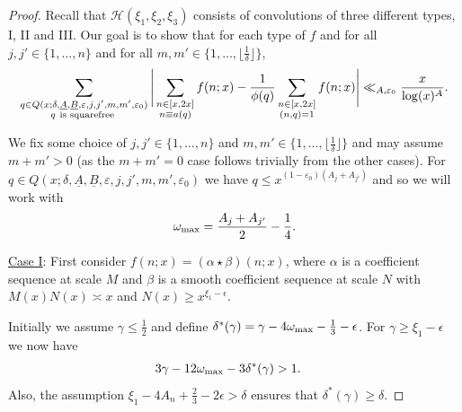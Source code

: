 \documentclass{amsart}
\numberwithin{equation}{section}
\begin{document}
\begin{proof}
Recall that $\mathcal{H}(\xi_1,\xi_2,\xi_3)$ consists of convolutions of three different types, I, II and III.   Our goal is to show that for each type of $f$ and for   all $j, j'\in \{1, \dots, n\}$ and for all $m, m' \in \{1, \dots, \lfloor \frac{1}{\delta} \rfloor\}$,
\begin{align*} 
\sum_{\substack{q \in Q(x;\delta,\underline{A},\underline{B},\varepsilon,j,j',m,m',\varepsilon_0) \\  q \mbox{ \scriptsize  is squarefree  }   }}  \Bigg| \sum_{\substack{n \in [x,2x] \\ n \equiv a (q)}} f(n;x) - \dfrac{1}{\phi(q)} \sum_{\substack{ n \in [x,2x] \\ (n,q)=1}}f(n;x) \Bigg| \ll_{A,\varepsilon_0} \dfrac{x}{\log(x)^A}.
\end{align*}

We fix some choice of $j, j'\in \{1, \dots, n\}$ and   $m, m' \in \{1, \dots, \lfloor \frac{1}{\delta} \rfloor\}$ and may assume $m+m' >0$ (as the $m+m'=0$ case follows trivially from the other cases). For $q  \in Q(x;\delta,\underline{A},\underline{B},\varepsilon,j,j',m,m',\varepsilon_0)$ we have 
$ q \leq  x^{(1-\varepsilon_0)(A_j + A_{j'})} $ and so we will work with 
$$ \omega_{\begin{scriptsize}
\mbox{max}
\end{scriptsize}} =   \frac{A_j + A_{j'}}{2}  - \frac{1}{4}.$$

\smallskip
\underline{Case I}: First consider  $f(n;x) = (\alpha \star \beta)(n;x)$, where $\alpha$ is a coefficient sequence at scale $M$ and $\beta$ is a  smooth  coefficient sequence at scale $N$ with $M(x) N(x) \asymp x$  and  $
N(x) \geq x^{ \xi_1-\epsilon} 
$. 



\medskip   Initially we assume $\gamma \leq \frac{1}{2}$ and define $
\delta^*(\gamma) =     \gamma - 4\omega_{\begin{scriptsize}
\mbox{max}
\end{scriptsize}} -\tfrac{1}{3}  -\epsilon 
$. For $\gamma \geq \xi_1-\epsilon$ we now have 
\begin{align*} 
 &3\gamma-12\omega_{\begin{scriptsize}
\mbox{max}
\end{scriptsize}}  -3\delta^*(\gamma) >1. 
\end{align*}
Also, the assumption $  \xi_1 - 4 A_n + \tfrac{2}{3}    -2\epsilon  > \delta$ ensures that $\delta^*(\gamma) \geq \delta$. 



\end{proof}
\end{document}
